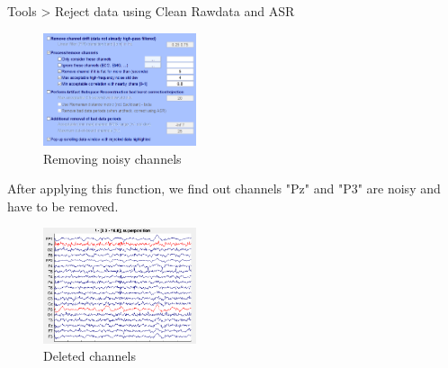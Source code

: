 \documentclass[hidelinks,12pt]{article}
\begin{document}
		Tools > Reject data using Clean Rawdata and ASR
		
		\begin{figure}[h!]
			\centering
			\includegraphics[width=0.4\textwidth]{9}
			\caption{Removing noisy channels}
		\end{figure}
		
	After applying this function, we find out channels "Pz" and "P3" are noisy and have to be removed.
		
		\begin{figure}[h!]
			\centering
			\includegraphics[width=0.4\textwidth]{10}
			\caption{Deleted channels}
		\end{figure}
		
\end{document}
